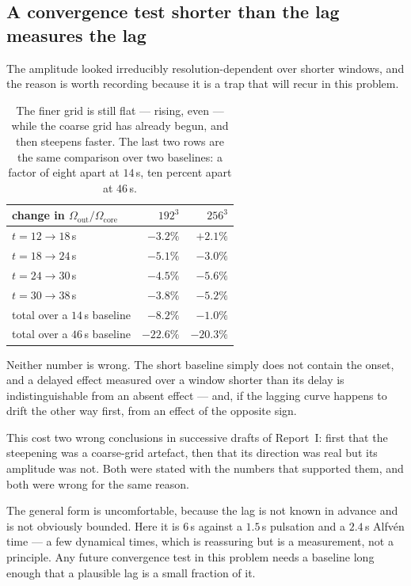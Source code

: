 \documentclass[11pt,a4paper]{article}
\newcommand{\Oout}{\Omega_{\mathrm{out}}}
\newcommand{\Ocore}{\Omega_{\mathrm{core}}}
\begin{document}
\subsection{A convergence test shorter than the lag measures the lag}

The amplitude looked irreducibly resolution-dependent over shorter windows, and
the reason is worth recording because it is a trap that will recur in this
problem.

\begin{table}[h]
\centering\small
\begin{tabular}{lrr}
\toprule
change in $\Oout/\Ocore$ & $192^3$ & $256^3$ \\
\midrule
$t = 12 \to 18$\,s & $-3.2\%$ & $\mathbf{+2.1\%}$ \\
$t = 18 \to 24$\,s & $-5.1\%$ & $-3.0\%$ \\
$t = 24 \to 30$\,s & $-4.5\%$ & $\mathbf{-5.6\%}$ \\
$t = 30 \to 38$\,s & $-3.8\%$ & $\mathbf{-5.2\%}$ \\
\midrule
total over a $14$\,s baseline & $-8.2\%$ & $-1.0\%$ \\
total over a $46$\,s baseline & $-22.6\%$ & $-20.3\%$ \\
\bottomrule
\end{tabular}
\caption{The finer grid is still flat --- rising, even --- while the coarse
grid has already begun, and then steepens faster. The last two rows are the
same comparison over two baselines: a factor of eight apart at $14$\,s, ten
percent apart at $46$\,s.}
\label{tab:lag}
\end{table}

Neither number is wrong. The short baseline simply does not contain the onset,
and a delayed effect measured over a window shorter than its delay is
indistinguishable from an absent effect --- and, if the lagging curve happens to
drift the other way first, from an effect of the opposite sign.

This cost two wrong conclusions in successive drafts of Report~I: first that
the steepening was a coarse-grid artefact, then that its direction was real but
its amplitude was not. Both were stated with the numbers that supported them,
and both were wrong for the same reason.

The general form is uncomfortable, because the lag is not known in advance and
is not obviously bounded. Here it is $6$\,s against a $1.5$\,s pulsation and a
$2.4$\,s Alfv\'en time --- a few dynamical times, which is reassuring but is a
measurement, not a principle. Any future convergence test in this problem needs
a baseline long enough that a plausible lag is a small fraction of it.
\end{document}
